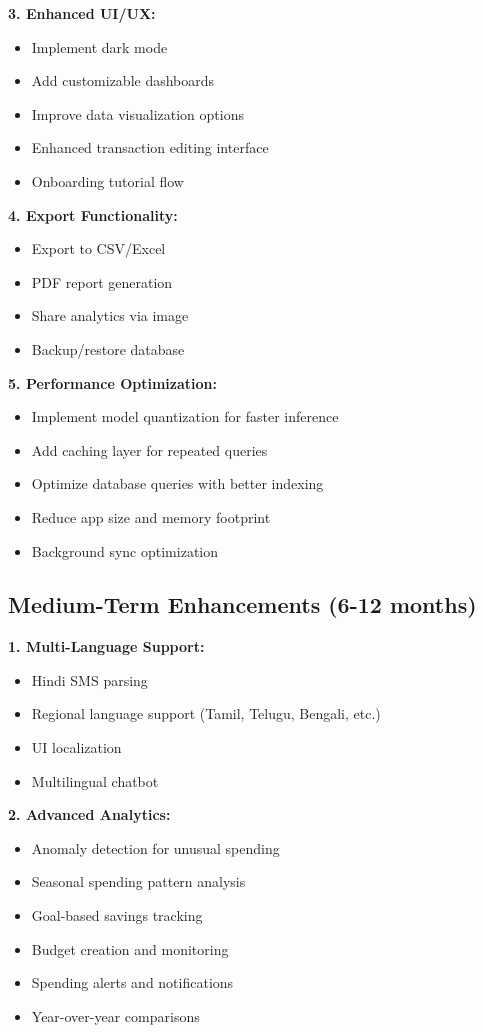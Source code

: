 \documentclass[11pt,a4paper]{report}
\begin{document}
\begin{itemize}
\textbf{3. Enhanced UI/UX:}
\begin{itemize}
    \item Implement dark mode
    \item Add customizable dashboards
    \item Improve data visualization options
    \item Enhanced transaction editing interface
    \item Onboarding tutorial flow
\end{itemize}

\textbf{4. Export Functionality:}
\begin{itemize}
    \item Export to CSV/Excel
    \item PDF report generation
    \item Share analytics via image
    \item Backup/restore database
\end{itemize}

\textbf{5. Performance Optimization:}
\begin{itemize}
    \item Implement model quantization for faster inference
    \item Add caching layer for repeated queries
    \item Optimize database queries with better indexing
    \item Reduce app size and memory footprint
    \item Background sync optimization
\end{itemize}

\subsection{Medium-Term Enhancements (6-12 months)}

\textbf{1. Multi-Language Support:}
\begin{itemize}
    \item Hindi SMS parsing
    \item Regional language support (Tamil, Telugu, Bengali, etc.)
    \item UI localization
    \item Multilingual chatbot
\end{itemize}

\textbf{2. Advanced Analytics:}
\begin{itemize}
    \item Anomaly detection for unusual spending
    \item Seasonal spending pattern analysis
    \item Goal-based savings tracking
    \item Budget creation and monitoring
    \item Spending alerts and notifications
    \item Year-over-year comparisons
\end{itemize}


\end{itemize}
\end{document}
